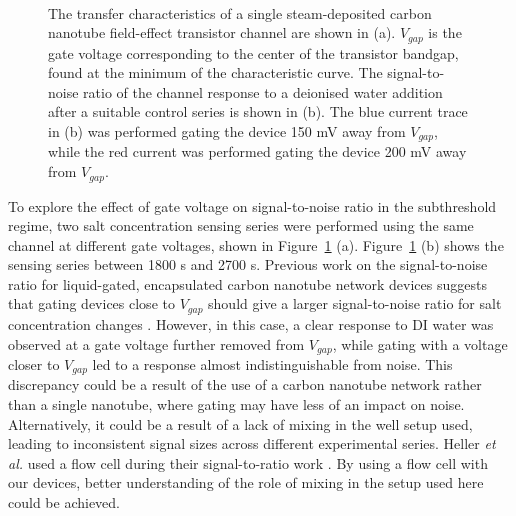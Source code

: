 \documentclass[
  a4paper,
]{scrbook}
\begin{document}
\begin{figure}
\begin{minipage}[t]{0.57\linewidth}
{{}

}

\end{minipage}%
%
\begin{minipage}[t]{0.19\linewidth}

{\centering 

~

}

\end{minipage}%

\caption[Figure demonstrating change in signal-to-noise ratio resulting
from adjusting gate voltage.]{\label{fig-salt-conc-SNR}The transfer
characteristics of a single steam-deposited carbon nanotube field-effect
transistor channel are shown in (a). \(V_{gap}\) is the gate voltage
corresponding to the center of the transistor bandgap, found at the
minimum of the characteristic curve. The signal-to-noise ratio of the
channel response to a deionised water addition after a suitable control
series is shown in (b). The blue current trace in (b) was performed
gating the device 150 mV away from \(V_{gap}\), while the red current
was performed gating the device 200 mV away from \(V_{gap}\).}

\end{figure}

To explore the effect of gate voltage on signal-to-noise ratio in the
subthreshold regime, two salt concentration sensing series were
performed using the same channel at different gate voltages, shown in
Figure~\ref{fig-salt-conc-SNR} (a). Figure~\ref{fig-salt-conc-SNR} (b)
shows the sensing series between 1800 s and 2700 s. Previous work on the
signal-to-noise ratio for liquid-gated, encapsulated carbon nanotube
network devices suggests that gating devices close to \(V_{gap}\) should
give a larger signal-to-noise ratio for salt concentration changes
\autocite{Heller2009}. However, in this case, a clear response to DI
water was observed at a gate voltage further removed from \(V_{gap}\),
while gating with a voltage closer to \(V_{gap}\) led to a response
almost indistinguishable from noise. This discrepancy could be a result
of the use of a carbon nanotube network rather than a single nanotube,
where gating may have less of an impact on noise. Alternatively, it
could be a result of a lack of mixing in the well setup used, leading to
inconsistent signal sizes across different experimental series. Heller
\emph{et al.} used a flow cell during their signal-to-ratio work
\autocite{Heller2009}. By using a flow cell with our devices, better
understanding of the role of mixing in the setup used here could be
achieved.
\end{document}
